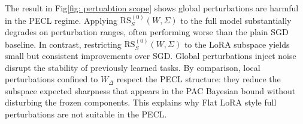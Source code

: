 \documentclass{article}
\theoremstyle{plain}
\theoremstyle{definition}
\theoremstyle{remark}
\begin{document}
The result in   Fig\ref{fig: pertuabtion scope} shows global perturbations are  harmful in the PECL regime. 
Applying $\mathrm{RS}_S^{(0)}({W}, \Sigma)$ to the full model substantially degrades on perturbation ranges, often performing worse than the plain SGD baseline. 
In contrast, restricting $\mathrm{RS}_S^{(0)}({W}, \Sigma)$ to the LoRA subspace yields small but consistent improvements over SGD.
Global perturbations inject noise disrupt the stability of previously learned tasks. 
By comparison, local perturbations confined to $W_\Delta$ respect the PECL structure: they reduce the subspace expected sharpness that appears in the PAC Bayesian bound without disturbing the frozen components. 
This explains why Flat LoRA style full perturbations are not suitable in the PECL.











\end{document}
